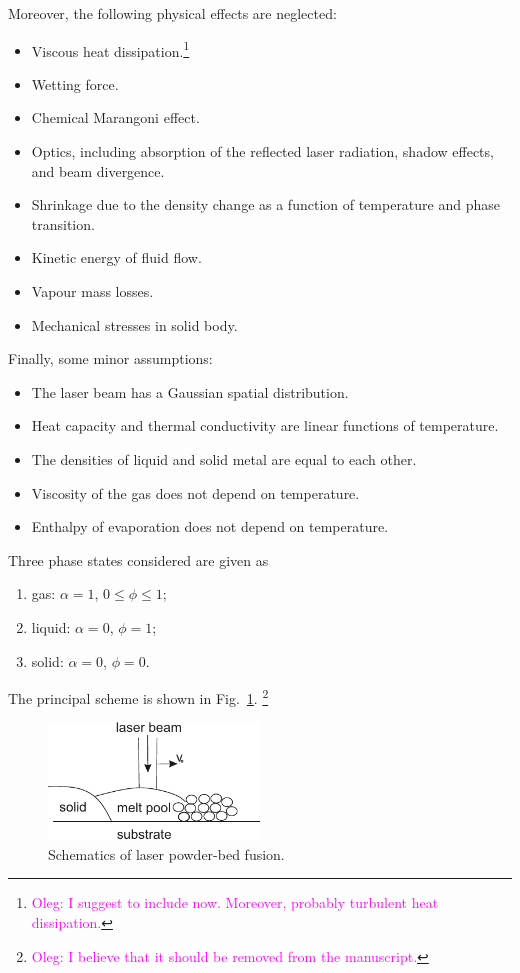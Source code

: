 \documentclass{article}
\newcommand{\oleg}[1]{\textcolor{magenta}{\footnote{\textcolor{magenta}{Oleg: #1}}}} %
\begin{document}
Moreover, the following physical effects are neglected:
\begin{itemize}
    \item Viscous heat dissipation.\oleg{I suggest to include now. Moreover, probably turbulent heat dissipation.}
    \item Wetting force.
    \item Chemical Marangoni effect.
    \item Optics, including absorption of the reflected laser radiation, shadow effects, and beam divergence.
    \item Shrinkage due to the density change as a function of temperature and phase transition.
    \item Kinetic energy of fluid flow.
    \item Vapour mass losses.
    \item Mechanical stresses in solid body.
\end{itemize}
Finally, some minor assumptions:
\begin{itemize}
    \item The laser beam has a Gaussian spatial distribution.
    \item Heat capacity and thermal conductivity are linear functions of temperature.
    \item The densities of liquid and solid metal are equal to each other.
    \item Viscosity of the gas does not depend on temperature.
    \item Enthalpy of evaporation does not depend on temperature.
\end{itemize}

Three phase states considered are given as
\begin{enumerate}[label=\arabic*)]
    \item gas: $\alpha=1$, $0\leq\phi\leq1$;
    \item liquid: $\alpha=0$, $\phi=1$;
    \item solid: $\alpha=0$, $\phi=0$.
\end{enumerate}

The principal scheme is shown in Fig.~\ref{fig:scheme}.
\oleg{I believe that it should be removed from the manuscript.}
\begin{figure}
    \centering
    \includegraphics[width = 0.5\textwidth]{scheme}
    \caption{
        Schematics of laser powder-bed fusion.
    }\label{fig:scheme}
\end{figure}
\end{document}

